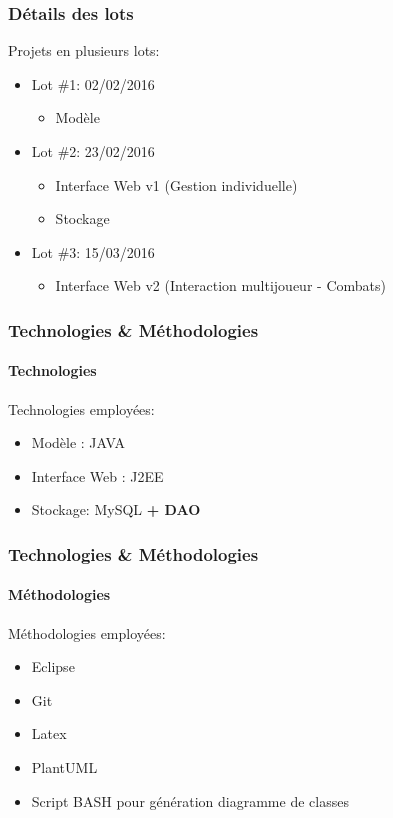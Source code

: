 \documentclass{beamer}
\begin{document}
    \begin{frame}
        \frametitle{D\'etails des lots}
        Projets en plusieurs lots:
        \begin{itemize}
            \item Lot \#1: 02/02/2016\\
                \begin{itemize}
                    \item Modèle
                \end{itemize}
            \item Lot \#2: 23/02/2016
                \begin{itemize}
                    \item Interface Web v1 (Gestion individuelle)
                    \item Stockage
                \end{itemize}
            \item Lot \#3: 15/03/2016
                \begin{itemize}
                    \item Interface Web v2 (Interaction multijoueur - Combats)
                \end{itemize}
        \end{itemize}
    \end{frame}

    \begin{frame}
        \frametitle{Technologies \& Méthodologies}
        \framesubtitle{Technologies}
        Technologies employées:
        \begin{itemize}
            \item Modèle : JAVA
            \item Interface Web : J2EE
            \item Stockage: MySQL \textbf{+ DAO}
        \end{itemize}
    \end{frame}
    \begin{frame}
        \frametitle{Technologies \& Méthodologies}
        \framesubtitle{Méthodologies}
        Méthodologies employées:
        \begin{itemize}
            \item Eclipse
            \item Git
            \item Latex
            \item PlantUML
            \item Script BASH pour génération diagramme de classes
        \end{itemize}
    \end{frame}
\end{document}
